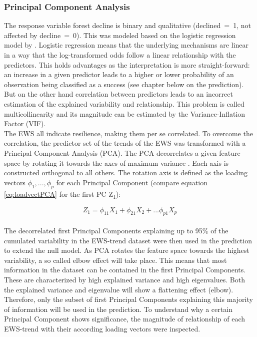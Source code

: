 \subsubsection{Principal Component Analysis}
The response variable forest decline is binary and qualitative (declined~=~1, not affected by decline~=~0). This was modeled based on the logistic regression model by \cite{chaparro2017}. Logistic regression means that the underlying mechanisms are linear in a way that the log-transformed odds follow a linear relationship with the predictors. This holds advantages as the interpretation is more straight-forward: an increase in a given predictor leads to a higher or lower probability of an observation being classified as a success (see chapter below on the prediction). But on the other hand correlation between predictors leads to an incorrect estimation of the explained variability and relationship. This problem is called multicollinearity and its magnitude can be estimated by the Variance-Inflation Factor (VIF).\\
The EWS all indicate resilience, making them per se correlated. To overcome the correlation, the predictor set of the trends of the EWS was transformed with a Principal Component Analysis (PCA). The PCA decorrelates a given feature space by rotating it towards the axes of maximum variance \citep{james2013}. Each axis is constructed orthogonal to all others. The rotation axis is defined as the loading vectors $\phi_1 , ..., \phi_p$ for each Principal Component (compare equation \ref{eq:loadvectPCA} for the first PC Z\textsubscript{1}): 

\begin{equation}\label{eq:loadvectPCA}
	Z_1 = \phi_{11}X_1 + \phi_{21}X_2 + ... \phi_{p1}X_p
\end{equation}\\

The decorrelated first Principal Components explaining up to 95\% of the cumulated variability in the EWS-trend dataset were then used in the prediction to extend the null model. As PCA rotates the feature space towards the highest variability, a so called elbow effect will take place. This means that most information in the dataset can be contained in the first Principal Components. These are characterized by high explained variance and high eigenvalues. Both the explained variance and eigenvalue will show a flattening effect (elbow). Therefore, only the subset of first Principal Components explaining this majority of information will be used in the prediction. To understand why a certain Principal Component shows significance, the magnitude of relationship of each EWS-trend with their according loading vectors were inspected.\\


